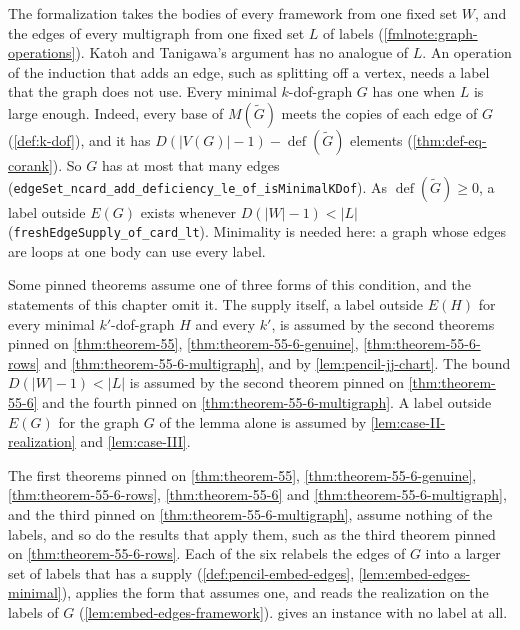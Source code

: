 \begin{remark}
  \label{rem:fresh-edge-supply}
  The formalization takes the bodies of every framework from one fixed
  set $W$, and the edges of every multigraph from one fixed set $L$ of
  labels (\cref{fmlnote:graph-operations}). Katoh and Tanigawa's
  argument has no analogue of $L$. An operation of the induction that
  adds an edge, such as splitting off a vertex, needs a label that the
  graph does not use. Every minimal $k$-dof-graph $G$ has one when $L$ is
  large enough. Indeed, every base of $M(\tilde G)$ meets the copies of
  each edge of $G$ (\cref{def:k-dof}), and it has
  $D(|V(G)| - 1) - \operatorname{def}(\tilde G)$ elements
  (\cref{thm:def-eq-corank}). So $G$ has at most that many edges
  (\texttt{edgeSet\_\allowbreak{}ncard\_\allowbreak{}add\_\allowbreak{}deficiency\_\allowbreak{}le\_\allowbreak{}of\_\allowbreak{}isMinimalKDof}).
  As $\operatorname{def}(\tilde G) \ge 0$, a label outside $E(G)$ exists
  whenever $D(|W| - 1) < |L|$
  (\texttt{freshEdgeSupply\_\allowbreak{}of\_\allowbreak{}card\_\allowbreak{}lt}).
  Minimality is needed here: a graph whose edges are loops at one body
  can use every label.

  Some pinned theorems assume one of three forms of this condition, and
  the statements of this chapter omit it. The supply itself, a label
  outside $E(H)$ for every minimal $k'$-dof-graph $H$ and every $k'$, is
  assumed by the second theorems pinned on \cref{thm:theorem-55},
  \cref{thm:theorem-55-6-genuine}, \cref{thm:theorem-55-6-rows} and
  \cref{thm:theorem-55-6-multigraph}, and by \cref{lem:pencil-jj-chart}.
  The bound $D(|W| - 1) < |L|$ is assumed by the second theorem pinned on
  \cref{thm:theorem-55-6} and the fourth pinned on
  \cref{thm:theorem-55-6-multigraph}. A label outside $E(G)$ for the
  graph $G$ of the lemma alone is assumed by
  \cref{lem:case-II-realization} and \cref{lem:case-III}.

  The first theorems pinned on \cref{thm:theorem-55},
  \cref{thm:theorem-55-6-genuine}, \cref{thm:theorem-55-6-rows},
  \cref{thm:theorem-55-6} and \cref{thm:theorem-55-6-multigraph}, and
  the third pinned on \cref{thm:theorem-55-6-multigraph}, assume nothing
  of the labels, and so do the results that apply them, such as the third
  theorem pinned on \cref{thm:theorem-55-6-rows}. Each of the six
  relabels the edges of $G$ into a larger set of labels that has
  a supply (\cref{def:pencil-embed-edges},
  \cref{lem:embed-edges-minimal}), applies the form that assumes one,
  and reads the realization on the labels of $G$
  (\cref{lem:embed-edges-framework}).
   gives an instance with no
  label at all.
\end{remark}

